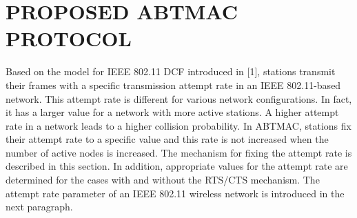 \documentclass[10pt,twocolumn,oneside,submit]{JCNtran}
\begin{document}
\vspace{10pt}
\section{\uppercase{PROPOSED ABTMAC PROTOCOL}}
\label{sec:prop}
Based on the model for IEEE 802.11 DCF introduced in [1], stations transmit their frames with a specific transmission attempt rate in an IEEE 802.11-based network. This attempt rate is different for various network configurations. In fact, it has a larger value for a network with more active stations. A higher attempt rate in a network leads to a higher collision probability. In ABTMAC, stations fix their attempt rate to a specific value and this rate is not increased when the number of active nodes is increased. The mechanism for fixing the attempt rate is described in this section. In addition, appropriate values for the attempt rate are determined for the cases with and without the RTS/CTS mechanism. The attempt rate parameter of an IEEE 802.11 wireless network is introduced in the next paragraph.
\end{document}
